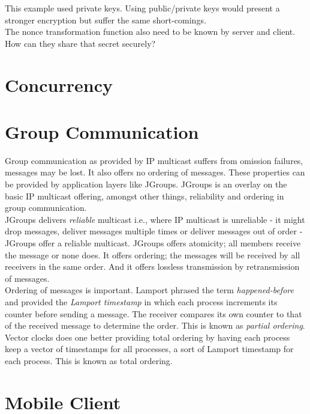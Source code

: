 This example used private keys. Using public/private keys would present a stronger encryption but suffer the same short-comings. \\

The nonce transformation function also need to be known by server and client. How can they share that secret securely?

\section{Concurrency}
\section{Group Communication}
Group communication as provided by IP multicast suffers from omission failures, messages may be lost. It also offers no ordering of messages. These properties can be provided by application layers like JGroups. JGroups is an overlay on the basic IP multicast offering, amongst other things, reliability and ordering in group communication. \\

JGroups delivers \emph{reliable} multicast i.e., where IP multicast is unreliable - it might drop messages, deliver messages multiple times or deliver messages out of order - JGroups offer a reliable multicast. JGroups offers atomicity; all members receive the message or none does. It offers ordering; the messages will be received by all receivers in the same order. And it offers lossless transmission by retransmission of messages.\\

Ordering of messages is important. Lamport phrased the term \emph{happened-before} and provided the \emph{Lamport timestamp} in which each process increments its counter before sending a message. The receiver compares its own counter to that of the received message to determine the order. This is known as \emph{partial ordering}.\\

Vector clocks does one better providing total ordering by having each process keep a vector of timestamps for all processes, a sort of Lamport timestamp for each process. This is known as total ordering. \\

\section{Mobile Client}